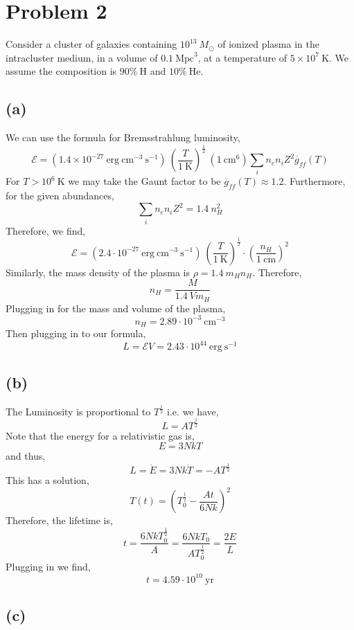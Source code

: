 \documentclass[12pt]{article}
\begin{document}
\section{Problem 2}

Consider a cluster of galaxies containing $10^{13} \: M_{\odot}$ of ionized plasma in the intracluster medium, in a volume of $0.1 \: \mathrm{Mpc}^3$, at a temperature of $5 \times 10^7 \: \mathrm{K}$. We assume the composition is $90 \% \: \mathrm{H}$ and $10 \% \: \mathrm{He}$. 

\subsection*{(a)}

We can use the formula for Bremsstrahlung luminosity,
\[ \mathcal{E} = (1.4 \times 10^{-27} \: \mathrm{erg} \: \mathrm{cm}^{-3} \: \mathrm{s}^{-1}) \: \left( \frac{T}{1 \: \mathrm{K}} \right)^{\frac{1}{2}} \: (1 \: \mathrm{cm}^6) \sum_i n_e n_i Z^2 \overline{g}_{ff}(T) \] 
For $T > 10^{6} \: \mathrm{K}$ we may take the Gaunt factor to be $\overline{g}_{ff}(T) \approx 1.2$. Furthermore, for the given abundances,
\[ \sum_i n_e n_i Z^2 = 1.4 \: n_H^2 \]
Therefore, we find,
\[ \mathcal{E} = (2.4 \cdot 10^{-27} \: \mathrm{erg} \: \mathrm{cm}^{-3} \: \mathrm{s}^{-1}) \: \left( \frac{T}{1 \: \mathrm{K}} \right)^{\frac{1}{2}} \cdot \left( \frac{n_H}{1 \: \mathrm{cm}} \right)^2 \]
Similarly, the mass density of the plasma is $\rho = 1.4 \: m_H n_H$. Therefore,
\[ n_H = \frac{M}{1.4 \: V m_H} \]
Plugging in for the mass and volume of the plasma,
\[ n_H = 2.89 \cdot 10^{-3} \: \mathrm{cm}^{-3} \]
Then plugging in to our formula,
\[ L = \mathcal{E} V = 2.43 \cdot 10^{44} \: \mathrm{erg} \: \mathrm{s}^{-1} \] 

\subsection*{(b)}

The Luminosity is proportional to $T^{\frac{1}{2}}$ i.e. we have,
\[ L = A T^{\frac{1}{2}} \]
Note that the energy for a relativistic gas is,
\[ E = 3 N k T \]
and thus,
\[ L = \dot{E} = 3 N k \dot{T} = - A T^{\frac{1}{2}} \]
This has a solution,
\[ T(t) = \left( T_0^{\frac{1}{2}} - \frac{A t}{6 N k}  \right)^2 \]
Therefore, the lifetime is,
\[ t = \frac{6 N k T_0^{\frac{1}{2}}}{A} = \frac{6 N k T_0}{A T_0^{\frac{1}{2}}} = \frac{2 E}{L} \]
Plugging in we find,
\[ t = 4.59  \cdot 10^{10} \: \mathrm{yr} \]

\subsection*{(c)}
\end{document}
